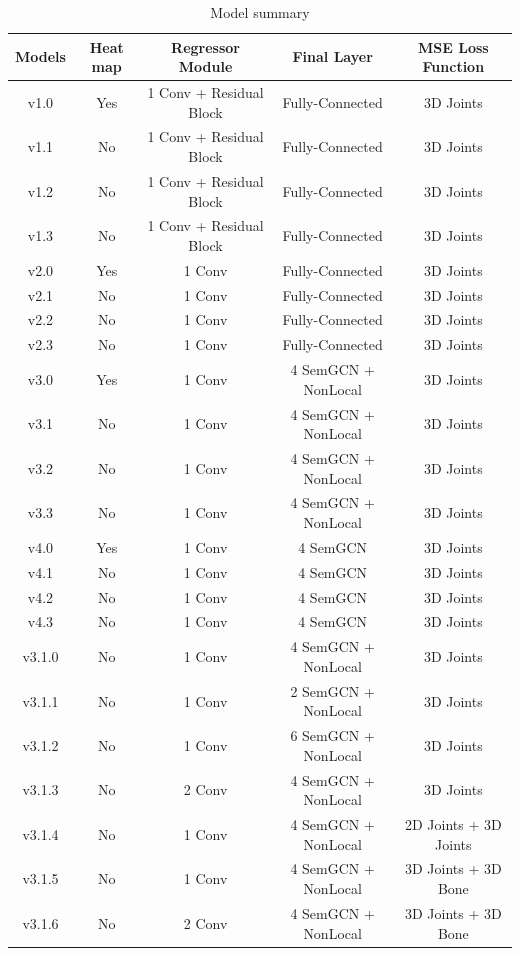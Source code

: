 \begin{table}[ht]
\centering
\begin{tabular*}{\textwidth}{c @{\extracolsep{\fill}} cccc}
\hline
Models & Heat map & Regressor Module & Final Layer & MSE Loss Function \\ [0.5ex] 
\hline
v1.0  & Yes & 1 Conv + Residual Block & Fully-Connected & 3D Joints \\
v1.1  & No & 1 Conv + Residual Block & Fully-Connected & 3D Joints \\ 
v1.2  & No & 1 Conv + Residual Block & Fully-Connected & 3D Joints \\ 
v1.3  & No & 1 Conv + Residual Block & Fully-Connected & 3D Joints \\ 
v2.0  & Yes & 1 Conv & Fully-Connected & 3D Joints \\
v2.1  & No & 1 Conv & Fully-Connected & 3D Joints \\ 
v2.2  & No & 1 Conv & Fully-Connected & 3D Joints \\ 
v2.3  & No & 1 Conv & Fully-Connected & 3D Joints \\ 
v3.0  & Yes & 1 Conv & 4 SemGCN + NonLocal & 3D Joints \\
v3.1  & No & 1 Conv & 4 SemGCN + NonLocal & 3D Joints \\ 
v3.2  & No & 1 Conv & 4 SemGCN + NonLocal & 3D Joints \\ 
v3.3  & No & 1 Conv & 4 SemGCN + NonLocal & 3D Joints \\ 
v4.0  & Yes & 1 Conv & 4 SemGCN & 3D Joints \\
v4.1  & No & 1 Conv & 4 SemGCN & 3D Joints \\ 
v4.2  & No & 1 Conv & 4 SemGCN & 3D Joints \\ 
v4.3  & No & 1 Conv & 4 SemGCN & 3D Joints \\ 
v3.1.0  & No & 1 Conv & 4 SemGCN + NonLocal & 3D Joints \\
v3.1.1  & No & 1 Conv & 2 SemGCN + NonLocal & 3D Joints \\
v3.1.2  & No & 1 Conv & 6 SemGCN + NonLocal & 3D Joints \\
v3.1.3  & No & 2 Conv & 4 SemGCN + NonLocal & 3D Joints \\
v3.1.4  & No & 1 Conv & 4 SemGCN + NonLocal & 2D Joints + 3D Joints \\
v3.1.5  & No & 1 Conv & 4 SemGCN + NonLocal & 3D Joints + 3D Bone \\
v3.1.6  & No & 2 Conv & 4 SemGCN + NonLocal & 3D Joints + 3D Bone \\
[1ex] 
\hline
\end{tabular*}
\caption{Model summary}
\label{table:model_summary}
\end{table}

